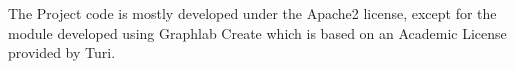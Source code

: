 The Project code is mostly developed under the Apache2 license, except for the module developed using Graphlab Create which is based on an Academic License provided by Turi.

%

